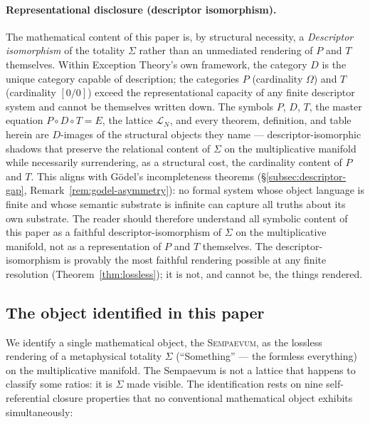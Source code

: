 \documentclass[11pt,a4paper]{article}
\theoremstyle{definition}
\theoremstyle{remark}
\newcommand{\Sempaevum}{\textnormal{\textsc{Sempaevum}}}
\newcommand{\PDT}{\ensuremath{P{\circ}D{\circ}T}}
\begin{document}
\paragraph{Representational disclosure (descriptor isomorphism).} The mathematical content of this paper is, by structural necessity, a \emph{Descriptor isomorphism} of the totality $\Sigma$ rather than an unmediated rendering of $P$ and $T$ themselves. Within Exception Theory's own framework, the category $D$ is the unique category capable of description; the categories $P$ (cardinality $\Omega$) and $T$ (cardinality $[0/0]$) exceed the representational capacity of any finite descriptor system and cannot be themselves written down. The symbols $P$, $D$, $T$, the master equation $\PDT = E$, the lattice $\mathcal{L}_{N}$, and every theorem, definition, and table herein are $D$-images of the structural objects they name --- descriptor-isomorphic shadows that preserve the relational content of $\Sigma$ on the multiplicative manifold while necessarily surrendering, as a structural cost, the cardinality content of $P$ and $T$. This aligns with Gödel's incompleteness theorems (\S\ref{subsec:descriptor-gap}, Remark~\ref{rem:godel-asymmetry}): no formal system whose object language is finite and whose semantic substrate is infinite can capture all truths about its own substrate. The reader should therefore understand all symbolic content of this paper as a faithful descriptor-isomorphism of $\Sigma$ on the multiplicative manifold, not as a representation of $P$ and $T$ themselves. The descriptor-isomorphism is provably the most faithful rendering possible at any finite resolution (Theorem~\ref{thm:lossless}); it is not, and cannot be, the things rendered.

\subsection{The object identified in this paper}

We identify a single mathematical object, the \Sempaevum, as the lossless rendering of a metaphysical totality $\Sigma$ (``Something'' --- the formless everything) on the multiplicative manifold. The Sempaevum is not a lattice that happens to classify some ratios: it is $\Sigma$ made visible. The identification rests on nine self-referential closure properties that no conventional mathematical object exhibits simultaneously:
\end{document}
